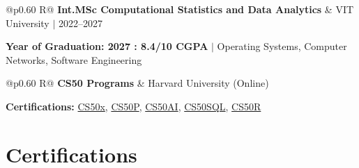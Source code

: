 \documentclass[a4paper,11pt]{article}
\newcommand{\subheading}[1]{\textbf{#1}}
\newcommand{\meta}[1]{{\fontsize{10}{12}\selectfont\textcolor[HTML]{3A3A3A}{#1}}}
\newcommand{\ulink}[2]{\href{#1}{#2}}
\begin{document}
\begin{tabularx}{\linewidth}{@{}p{0.60\linewidth} R@{}}
\subheading{Int.MSc Computational Statistics and Data Analytics} & \meta{VIT University $|$ 2022--2027}
\end{tabularx}
{\color[HTML]{3A3A3A}\fontsize{11}{14}\selectfont \textbf{Year of Graduation: 2027 : 8.4/10 CGPA} $|$ Operating Systems, Computer Networks, Software Engineering}

\begin{tabularx}{\linewidth}{@{}p{0.60\linewidth} R@{}}
\subheading{CS50 Programs} & \meta{Harvard University (Online)}
\end{tabularx}
{\color[HTML]{3A3A3A}\fontsize{11}{14}\selectfont \textbf{Certifications:} \ulink{https://cs50.harvard.edu/certificates/b14b78df-e05c-413e-a607-1dd27303053a}{CS50x}, \ulink{https://cs50.harvard.edu/certificates/32477052-9db4-49c4-a5a4-d7e58429ca2c}{CS50P}, \ulink{https://cs50.harvard.edu/certificates/9cdb4d4a-1250-4f8e-9fd7-191864e0f919}{CS50AI}, \ulink{https://cs50.harvard.edu/certificates/bc486f24-f085-4e61-8536-80940b97a1b9}{CS50SQL}, \ulink{https://cs50.harvard.edu/certificates/666838e6-a053-4d82-b179-a60fe745fd84}{CS50R}}

\section{Certifications}
\vspace{2pt}
\end{document}
